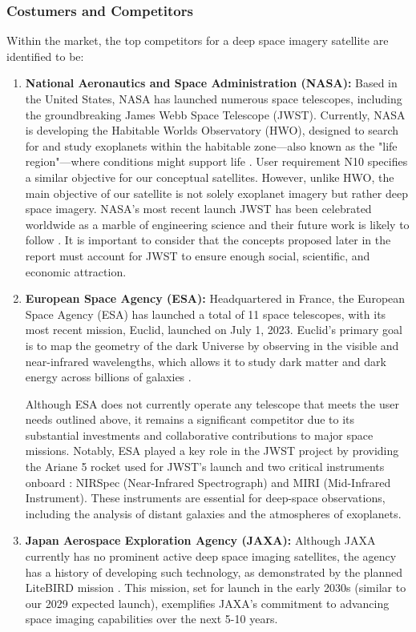 \subsubsection{Costumers and Competitors}
Within the market, the top competitors for a deep space imagery satellite are identified to be: 
\begin{enumerate}
    \item \textbf{National Aeronautics and Space Administration (NASA):} Based in the United States, NASA has launched numerous space telescopes, including the groundbreaking James Webb Space Telescope (JWST). Currently, NASA is developing the Habitable Worlds Observatory (HWO), designed to search for and study exoplanets within the habitable zone—also known as the "life region"—where conditions might support life \cite{NASA_HWO}. User requirement N10 specifies a similar objective for our conceptual satellites. However, unlike HWO, the main objective of our satellite is not solely exoplanet imagery but rather deep space imagery. NASA's most recent launch JWST has been celebrated worldwide as a marble of engineering science and their future work is likely to follow \cite{Pacucci2023}. It is important to consider that the concepts proposed later in the report must account for JWST to ensure enough social, scientific, and economic attraction. 
    
    \item \textbf{European Space Agency (ESA):} Headquartered in France, the European Space Agency (ESA) has launched a total of 11 space telescopes, with its most recent mission, Euclid, launched on July 1, 2023. Euclid’s primary goal is to map the geometry of the dark Universe by observing in the visible and near-infrared wavelengths, which allows it to study dark matter and dark energy across billions of galaxies \cite{ESA_Euclid}.
\vspace{1.5mm}

Although ESA does not currently operate any telescope that meets the user needs outlined above, it remains a significant competitor due to its substantial investments and collaborative contributions to major space missions. Notably, ESA played a key role in the JWST project by providing the Ariane 5 rocket \cite{ESA_Ariane5} used for JWST’s launch and two critical instruments onboard \cite{Gardner2006}: NIRSpec (Near-Infrared Spectrograph) and MIRI (Mid-Infrared Instrument). These instruments are essential for deep-space observations, including the analysis of distant galaxies and the atmospheres of exoplanets.
    \item \textbf{Japan Aerospace Exploration Agency (JAXA):} Although JAXA currently has no prominent active deep space imaging satellites, the agency has a history of developing such technology, as demonstrated by the planned LiteBIRD mission \cite{LiteBIRD2024}. This mission, set for launch in the early 2030s (similar to our 2029 expected launch), exemplifies JAXA's commitment to advancing space imaging capabilities over the next 5-10 years.


\end{enumerate}
